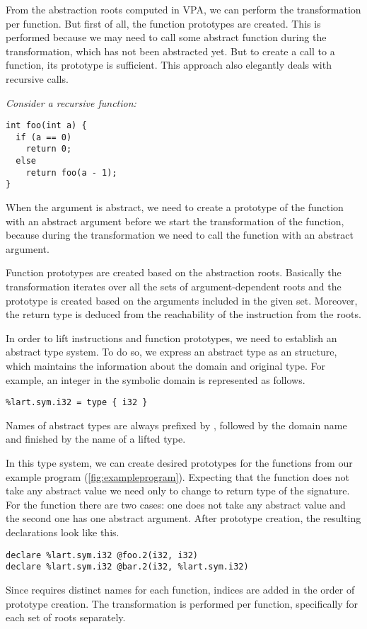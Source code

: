 From the abstraction roots computed in VPA, we can perform the transformation per
function. But first of all, the function prototypes are created. This is performed because we may need to call some abstract function during the transformation, which has not been abstracted yet. But to create a call to a function, its prototype is sufficient. This approach also elegantly deals with recursive calls.
\begin{marginfigure}
\itshape\footnotesize
Consider a recursive function:
\begin{verbatim}
int foo(int a) {
  if (a == 0)
    return 0;
  else
    return foo(a - 1);
}
\end{verbatim}
    When the argument  is abstract, we need to create a prototype of
    the function  with an abstract argument before we start the
    transformation of the function, because during the transformation we need to
    call the function  with an abstract argument.
\end{marginfigure}

Function prototypes are created based on the abstraction roots. Basically
the transformation iterates over all the sets of argument-dependent roots and
the prototype is created based on the arguments included in the given set.
Moreover, the return type is deduced from the reachability of the  instruction
from the roots.

In order to lift \LLVM instructions and function prototypes, we need to
establish an abstract type system. To do so, we express an abstract type as an
\LLVM structure, which maintains the information about the domain and original
type. For example, an integer in the symbolic domain is represented as follows.

\begin{verbatim}
%lart.sym.i32 = type { i32 }
\end{verbatim}

Names of abstract types are always prefixed by , followed by the
domain name and finished by the name of a lifted \LLVM type.

In this type system, we can create desired prototypes for the functions from our
example program (\autoref{fig:exampleprogram}). Expecting that the function 
does not take any abstract value we need only to change to return type of the
signature. For the function  there are two cases: one does not take any
abstract value and the second one has one abstract argument. After prototype
creation, the resulting \LLVM declarations look like this.
\begin{verbatim}
declare %lart.sym.i32 @foo.2(i32, i32)
declare %lart.sym.i32 @bar.2(i32, %lart.sym.i32)
\end{verbatim}
Since \LLVM requires distinct names for each function, indices are added in
the order of prototype creation. The transformation is performed per function,
specifically for each set of roots separately.

